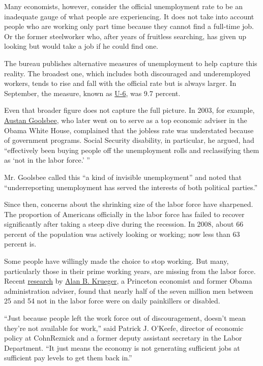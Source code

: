 Many economists, however, consider the official unemployment rate to be
an inadequate gauge of what people are experiencing. It does not take
into account people who are working only part time because they cannot
find a full-time job. Or the former steelworker who, after years of
fruitless searching, has given up looking but would take a job if he
could find one.

The bureau publishes alternative measures of unemployment to help
capture this reality. The broadest one, which includes both discouraged
and underemployed workers, tends to rise and fall with the official rate
but is always larger. In September, the measure, known as
\href{http://www.bls.gov/news.release/empsit.t15.htm}{U-6}, was 9.7
percent.

Even that broader figure does not capture the full picture. In 2003, for
example,
\href{http://www.nytimes.com/2003/11/30/opinion/the-index-of-missing-economic-indicators-the-unemployment-myth.html}{Austan
Goolsbee}, who later went on to serve as a top economic adviser in the
Obama White House, complained that the jobless rate was understated
because of government programs. Social Security disability, in
particular, he argued, had ``effectively been buying people off the
unemployment rolls and reclassifying them as `not in the labor force.'
''

Mr. Goolsbee called this ``a kind of invisible unemployment'' and noted
that ``underreporting unemployment has served the interests of both
political parties.''

Since then, concerns about the shrinking size of the labor force have
sharpened. The proportion of Americans officially in the labor force has
failed to recover significantly after taking a steep dive during the
recession. In 2008, about 66 percent of the population was actively
looking or working; now less than 63 percent is.

Some people have willingly made the choice to stop working. But many,
particularly those in their prime working years, are missing from the
labor force. Recent
\href{http://www.nytimes.com/2016/10/17/opinion/millions-of-men-are-missing-from-the-job-market.html}{research}
by \href{http://www.nytimes.com/by/alan-b-krueger?inline=nyt-per}{Alan
B. Krueger}, a Princeton economist and former Obama administration
adviser, found that nearly half of the seven million men between 25 and
54 not in the labor force were on daily painkillers or disabled.

``Just because people left the work force out of discouragement, doesn't
mean they're not available for work,'' said Patrick J. O'Keefe, director
of economic policy at CohnReznick and a former deputy assistant
secretary in the Labor Department. ``It just means the economy is not
generating sufficient jobs at sufficient pay levels to get them back
in.''

